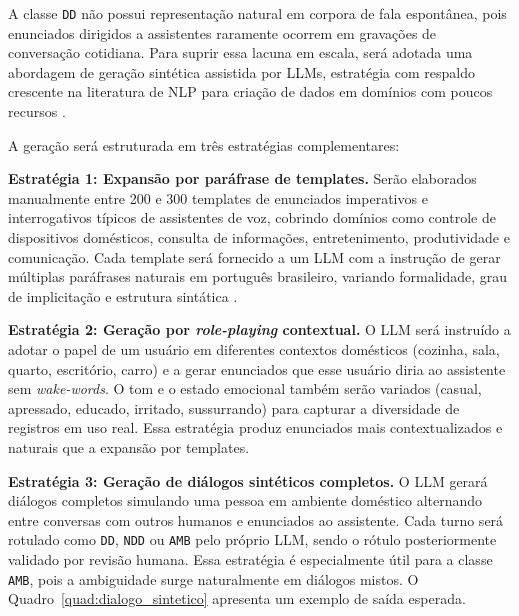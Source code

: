 \documentclass[
    12pt,                %
    openright,           %
    oneside,             %
    a4paper,             %
    english,             %
    brazil               %
]{abntex2}
\begin{document}
A classe \texttt{DD} não possui representação natural em corpora de fala espontânea, pois enunciados dirigidos a assistentes raramente ocorrem em gravações de conversação cotidiana. Para suprir essa lacuna em escala, será adotada uma abordagem de geração sintética assistida por LLMs, estratégia com respaldo crescente na literatura de NLP para criação de dados em domínios com poucos recursos \cite{Møller2024}.

A geração será estruturada em três estratégias complementares:

\textbf{Estratégia 1: Expansão por paráfrase de templates.}
Serão elaborados manualmente entre 200 e 300 templates de enunciados imperativos e interrogativos típicos de assistentes de voz, cobrindo domínios como controle de dispositivos domésticos, consulta de informações, entretenimento, produtividade e comunicação. Cada template será fornecido a um LLM com a instrução de gerar múltiplas paráfrases naturais em português brasileiro, variando formalidade, grau de implicitação e estrutura sintática \cite{Møller2024}.

\textbf{Estratégia 2: Geração por \textit{role-playing} contextual.}
O LLM será instruído a adotar o papel de um usuário em diferentes contextos domésticos (cozinha, sala, quarto, escritório, carro) e a gerar enunciados que esse usuário diria ao assistente sem \textit{wake-words}. O tom e o estado emocional também serão variados (casual, apressado, educado, irritado, sussurrando) para capturar a diversidade de registros em uso real. Essa estratégia produz enunciados mais contextualizados e naturais que a expansão por templates.

\textbf{Estratégia 3: Geração de diálogos sintéticos completos.}
O LLM gerará diálogos completos simulando uma pessoa em ambiente doméstico alternando entre conversas com outros humanos e enunciados ao assistente. Cada turno será rotulado como \texttt{DD}, \texttt{NDD} ou \texttt{AMB} pelo próprio LLM, sendo o rótulo posteriormente validado por revisão humana. Essa estratégia é especialmente útil para a classe \texttt{AMB}, pois a ambiguidade surge naturalmente em diálogos mistos. O Quadro~\ref{quad:dialogo_sintetico} apresenta um exemplo de saída esperada.
\end{document}
